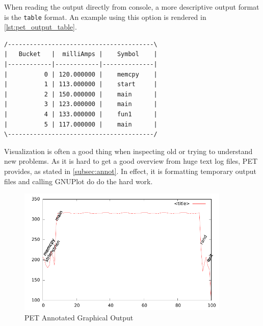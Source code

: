 When reading the output directly from console, a more descriptive output format
is the \texttt{table} format. An example using this option is rendered in
\autoref{lst:pet_output_table}.

\begin{lstlisting}[float,label={lst:pet_output_table},caption={PET Table Output}]
/----------------------------------------\
|   Bucket   |  milliAmps |    Symbol    |
|------------|------------|--------------|
|          0 | 120.000000 |    memcpy    |
|          1 | 113.000000 |    start     |
|          2 | 150.000000 |    main      |
|          3 | 123.000000 |    main      |
|          4 | 133.000000 |    fun1      |
|          5 | 117.000000 |    main      |
\----------------------------------------/
\end{lstlisting}

Visualization is often a good thing when inspecting old or trying to understand
new problems. As it is hard to get a good overview from huge text log files, PET
provides, as stated in \autoref{subsec:annot}. In effect, it is formatting
temporary output files and calling GNUPlot do do the hard work.

\begin{figure}
    \includegraphics[width=0.9\textwidth]{figs/annot.pdf}
    \caption{PET Annotated Graphical Output}
    \label{fig:annot}
\end{figure}

